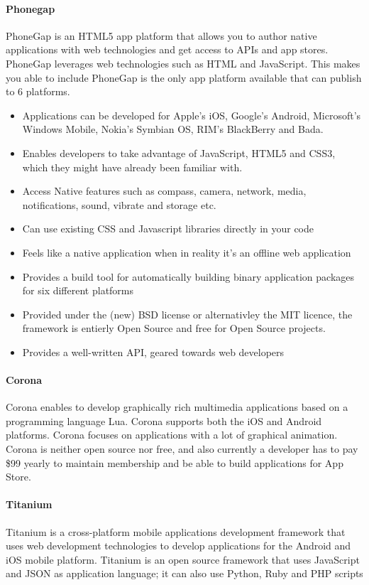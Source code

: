 \paragraph{Phonegap}
PhoneGap is an HTML5 app platform that allows you to author native applications with web technologies and get access to APIs and app stores. PhoneGap leverages web technologies such as HTML and JavaScript. This makes you able to include PhoneGap is the only app platform available that can publish to 6 platforms.
\cite{phonegap:about}
	\begin{itemize}
		\item Applications can be developed for Apple’s iOS, Google’s Android,
		Microsoft’s Windows Mobile, Nokia’s Symbian OS, RIM’s BlackBerry and Bada.
		\item Enables developers to take advantage of JavaScript, HTML5 and CSS3,
		which they might have already been familiar with.
		\item Access Native features such as compass, camera, network, media,
		notifications, sound, vibrate and storage etc.
    \item Can use existing CSS and Javascript libraries directly in your code
    \item Feels like a native application when in reality it's an offline web application
    \item Provides a build tool for automatically building binary application packages for six different platforms
    \item Provided under the (new) BSD license or alternativley the MIT licence, the framework is entierly Open Source and free for Open Source projects.
    \item Provides a well-written API, geared towards web developers
	\end{itemize}

\paragraph{Corona}
Corona enables to develop graphically rich multimedia applications based on a programming
language Lua\cite{corona:about}. Corona supports both the iOS and Android platforms. Corona focuses on
applications with a lot of graphical animation. Corona is neither open source nor free, and also currently a developer
has to pay \$99 yearly to maintain membership and be able to build applications for App Store.

\paragraph{Titanium}
Titanium is a cross-platform mobile applications development framework that uses web
development technologies to develop applications for the Android and iOS mobile platform.
Titanium is an open source framework that uses JavaScript and JSON as application language;
it can also use Python, Ruby and PHP scripts\cite{titanium:about}
